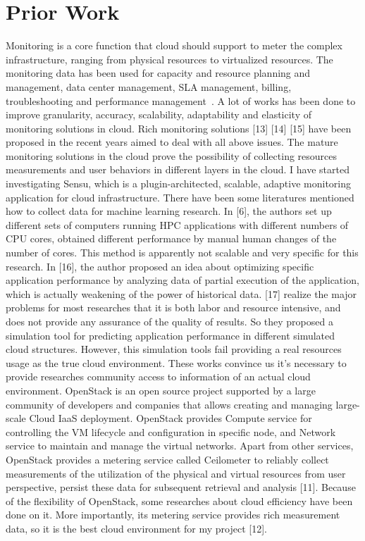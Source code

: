 

\section{Prior Work}
\label{sec:PriorWork}

Monitoring is a core function that cloud should support to meter the complex infrastructure, ranging from physical resources to virtualized resources. The monitoring data has been used for capacity and resource planning and management, data center management, SLA management, billing, troubleshooting and performance management~\cite{Aceto2013}. A lot of works has been done to improve granularity, accuracy, scalability, adaptability and elasticity of monitoring solutions in cloud. Rich monitoring solutions [13] [14] [15] have been proposed in the recent years aimed to deal with all above issues. The mature monitoring solutions in the cloud prove the possibility of collecting resources measurements and user behaviors in different layers in the cloud. I have started investigating Sensu, which is a plugin-architected, scalable, adaptive monitoring application for cloud infrastructure.
There have been some literatures mentioned how to collect data for machine learning research. In [6], the authors set up different sets of computers running HPC applications with different numbers of CPU cores, obtained different performance by manual human changes of the number of cores. This method is apparently not scalable and very specific for this research. In [16], the author proposed an idea about optimizing specific application performance by analyzing data of partial execution of the application, which is actually weakening of the power of historical data. [17] realize the major problems for most researches that it is both labor and resource intensive, and does not provide any assurance of the quality of results. So they proposed a simulation tool for predicting application performance in different simulated cloud structures. However, this simulation tools fail providing a real resources usage as the true cloud environment. These works convince us it’s necessary to provide researches community access to information of an actual cloud environment.
OpenStack is an open source project supported by a large community of developers and companies that allows creating and managing large-scale Cloud IaaS deployment. OpenStack provides Compute service for controlling the VM lifecycle and configuration in specific node, and Network service to maintain and manage the virtual networks. Apart from other services, OpenStack provides a metering service called Ceilometer to reliably collect measurements of the utilization of the physical and virtual resources from user perspective, persist these data for subsequent retrieval and analysis [11]. Because of the flexibility of OpenStack, some researches about cloud efficiency have been done on it. More importantly, its metering service provides rich measurement data, so it is the best cloud environment for my project [12].
